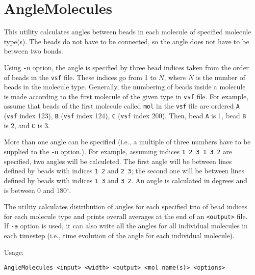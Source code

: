 \section{AngleMolecules} \label{sec:AngleMolecules}

This utility calculates angles between beads in each molecule of specified
molecule type(s). The beads do not have to be connected, so the angle does
not have to be between two bonds.

Using \texttt{-n} option, the angle is specified by three bead indices taken
from the order of beads in the \texttt{vsf} file. These indices go from 1
to $N$, where $N$ is the number of beads in the molecule type. Generally,
the numbering of beads inside a molecule is made according to the first
molecule of the given type in \texttt{vsf} file. For example, assume that
beads of the first molecule called \texttt{mol} in the \texttt{vsf} file
are ordered \texttt{A} (\texttt{vsf} index 123), \texttt{B} (\texttt{vsf}
index 124), \texttt{C} (\texttt{vsf} index 200). Then, bead \texttt{A} is
1, bead \texttt{B} is 2, and \texttt{C} is 3.

More than one angle can be specified (i.e., a multiple of three numbers
have to be supplied to the \texttt{-n} option.). For example, assuming
indices \texttt{1 2 3 1 3 2} are specified, two angles will be calculeted.
The first angle will be between lines defined by beads with indices
\texttt{1 2} and \texttt{2 3}; the second one will be between lines defined
by beads with indices \texttt{1 3} and \texttt{3 2}. An angle is calculated in
degrees and is between 0 and 180$^{\circ}$.

The utility calculates distribution of angles for each specified trio of
bead indices for each molecule type and prints overall averages at the end
of an \texttt{<output>} file. If \texttt{-a} option is used, it can also write
all the angles for all individual molecules in each timestep (i.e., time
evolution of the angle for each individual molecule).

Usage:

\vspace{1em}
\noindent
\texttt{AngleMolecules <input> <width> <output> <mol name(s)> <options>}

